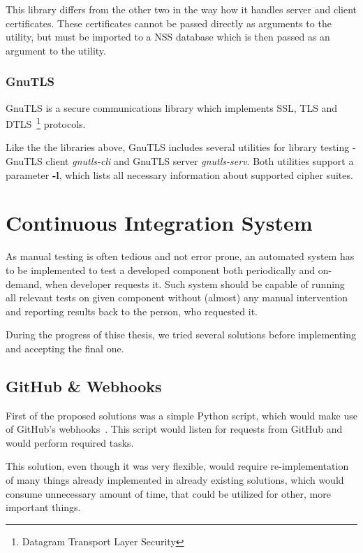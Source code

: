     This library differs from the other two in the way how it handles
    server and client certificates. These certificates cannot be passed
    directly as arguments to the utility, but must be imported to a NSS
    database which is then passed as an argument to the utility.

\subsection{GnuTLS}
    GnuTLS is a secure communications library which implements SSL, TLS and
    DTLS~\footnote{Datagram Transport Layer Security} protocols.

    Like the the libraries above, GnuTLS includes several utilities for library
    testing - GnuTLS client \textit{gnutls-cli} and GnuTLS server
    \textit{gnutls-serv}. Both utilities support a parameter \textbf{-l},
    which lists all necessary information about supported cipher suites.


\chapter{Continuous Integration System} \label{chap:continuous_integration}
    As manual testing is often tedious and not error prone, an automated system
    has to be implemented to test a developed component both periodically and
    on-demand, when developer requests it. Such system should be capable of
    running all relevant tests on given component without (almost) any manual
    intervention and reporting results back to the person, who requested
    it.~\cite{amazon-ci}

    During the progress of thise thesis, we tried several solutions before
    implementing and accepting the final one.

\section{GitHub \& Webhooks}
    First of the proposed solutions was a simple Python script, which would
    make use of GitHub's webhooks~\cite{github-webhooks}. This script would listen
    for requests from GitHub and would perform required tasks.

    This solution, even though it was very flexible, would require re-implementation
    of many things already implemented in already existing solutions, which would
    consume unnecessary amount of time, that could be utilized for other, more important things.

